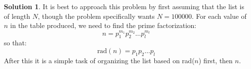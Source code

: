\documentclass[12pt, letterpaper, onecolumn, conference, final]{IEEEtran}
\theoremstyle{definition}
\newtheorem*{solution*}{Solution}
\theoremstyle{plain}
\begin{document}
\vspace{.3cm}
\begin{solution*}
It is best to approach this problem by first assuming that the list is of length $N$, though the problem specifically wants $N=100000$. For each value of $n$ in the table produced, we need to find the prime factorization:
\begin{equation*}
n = p_1^{m_1} p_2^{m_2} \dots p_l^{m_l}
\end{equation*}
so that:
\begin{equation*}
\text{rad}(n) = p_1 p_2 \dots p_l
\end{equation*}
After this it is a simple task of organizing the list based on rad($n$) first, then $n$. 
\end{solution*}
\end{document}
